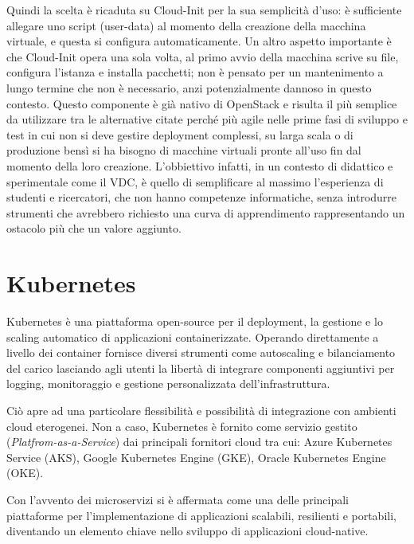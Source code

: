 \documentclass[12pt,a4paper,openright,twoside]{book}
\begin{document}
Quindi la scelta è ricaduta su Cloud-Init per la sua semplicità d'uso: è sufficiente allegare uno script (user-data) al momento della creazione della macchina virtuale, e questa si configura automaticamente.
Un altro aspetto importante è che Cloud-Init opera una sola volta, al primo avvio della macchina scrive su file, configura l'istanza e installa pacchetti; non è pensato per un mantenimento a lungo termine che non è necessario,
anzi potenzialmente dannoso in questo contesto. 
Questo componente è già nativo di OpenStack e risulta il più semplice da utilizzare tra le alternative citate perché più agile nelle prime fasi di sviluppo e test in cui non si deve gestire deployment complessi, su larga scala o
di produzione bensì si ha bisogno di macchine virtuali pronte all'uso fin dal momento della loro creazione.
L'obbiettivo infatti, in un contesto di didattico e sperimentale come il VDC, è quello di semplificare al massimo l'esperienza di studenti e ricercatori, che non hanno competenze informatiche, senza introdurre strumenti che avrebbero richiesto una curva di apprendimento
rappresentando un ostacolo più che un valore aggiunto.

%
\section{Kubernetes}
\label{sec:kube}
%
%
Kubernetes è una piattaforma open-source per il deployment, la gestione e lo scaling automatico di applicazioni containerizzate. 
Operando direttamente a livello dei container fornisce diversi strumenti come autoscaling e bilanciamento del carico lasciando agli utenti la libertà di integrare componenti aggiuntivi per logging, monitoraggio e gestione personalizzata dell'infrastruttura.

Ciò apre ad una particolare flessibilità e possibilità di integrazione con ambienti cloud eterogenei. Non a caso, Kubernetes è fornito come servizio gestito (\textit{Platfrom-as-a-Service}) dai principali fornitori cloud tra cui: Azure Kubernetes Service (AKS), Google Kubernetes Engine (GKE), Oracle Kubernetes Engine (OKE).

Con l'avvento dei microservizi si è affermata come una delle principali piattaforme per l'implementazione di applicazioni scalabili, resilienti e portabili, diventando un elemento chiave nello sviluppo di applicazioni cloud-native.
\end{document}
